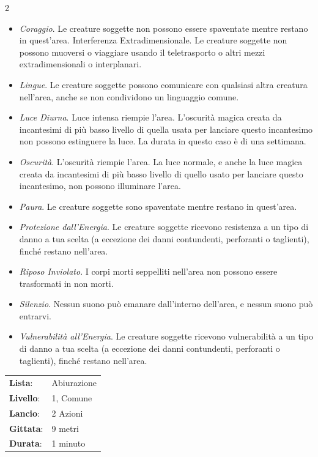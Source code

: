 \begin{multicols}{2}
\begin{itemize}[leftmargin=*] \setlength{\itemsep}{0pt}
	\item \emph{Coraggio}. Le creature soggette non possono essere spaventate mentre restano in quest'area. Interferenza Extradimensionale. Le creature soggette non possono muoversi o viaggiare usando il teletrasporto o altri mezzi extradimensionali o interplanari.
	\item \emph{Lingue}. Le creature soggette possono comunicare con qualsiasi altra creatura nell'area, anche se non condividono un linguaggio comune.
	\item \emph{Luce Diurna}. Luce intensa riempie l'area. L'oscurità magica creata da incantesimi di più basso livello di quella usata per lanciare questo incantesimo non possono estinguere la luce. La durata in questo caso è di una settimana.
	\item \emph{Oscurità}. L'oscurità riempie l'area. La luce normale, e anche la luce magica creata da incantesimi di più basso livello di quello usato per lanciare questo incantesimo, non possono illuminare l'area.
	\item \emph{Paura}. Le creature soggette sono spaventate mentre restano in quest'area.
	\item \emph{Protezione dall'Energia}. Le creature soggette ricevono resistenza a un tipo di danno a tua scelta (a eccezione dei danni contundenti, perforanti o taglienti), finché restano nell'area.
	\item \emph{Riposo Inviolato}. I corpi morti seppelliti nell'area non possono essere trasformati in non morti.
	\item \emph{Silenzio}. Nessun suono può emanare dall'interno dell'area, e nessun suono può entrarvi.
	\item \emph{Vulnerabilità all'Energia}. Le creature soggette ricevono vulnerabilità a un tipo di danno a tua scelta (a eccezione dei danni contundenti, perforanti o taglienti), finché restano nell'area.
\end{itemize}

\noindent\begin{tabularx}{\linewidth}{p{1.9cm}X}
	\rowcolor{gray!20}\textbf{Lista}: & Abiurazione \\
	\textbf{Livello}: & 1, Comune \\
	\rowcolor{gray!20}\textbf{Lancio}: & 2 Azioni \\
	\textbf{Gittata}: & 9 metri \\
	\rowcolor{gray!20}\textbf{Durata}: & 1 minuto \\
\end{tabularx}\smallskip


\end{multicols}
